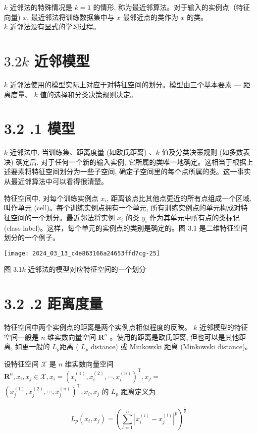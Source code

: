 \documentclass[10pt]{article}
\begin{document}
$k$ 近邻法的特殊情况是 $k=1$ 的情形, 称为最近邻算法。对于输入的实例点（特征向量) $x$, 最近邻法将训练数据集中与 $x$ 最邻近点的类作为 $x$ 的类。\\
$k$ 近邻法没有显式的学习过程。

\section*{$3.2 k$ 近邻模型}
$k$ 近邻法使用的模型实际上对应于对特征空间的划分。模型由三个基本要素 — 距离度量、 $k$ 值的选择和分类决策规则决定。

\section*{3.2 .1 模型}
$k$ 近邻法中, 当训练集、距离度量 (如欧氏距离) $、 k$ 值及分类决策规则 (如多数表决) 确定后, 对于任何一个新的输入实例, 它所属的类唯一地确定。这相当于根据上述要素将特征空间划分为一些子空间, 确定子空间里的每个点所属的类。这一事实从最近邻算法中可以看得很清楚。

特征空间中, 对每个训练实例点 $x_{i}$, 距离该点比其他点更近的所有点组成一个区域, 叫作单元 (cell)。每个训练实例点拥有一个单元, 所有训练实例点的单元构成对特征空间的一个划分。最近邻法将实例 $x_{i}$ 的类 $y_{i}$ 作为其单元中所有点的类标记 (class label)。这样，每个单元的实例点的类别是确定的。图 3.1 是二维特征空间划分的一个例子。

\begin{center}
\texttt{[image: 2024\_03\_13\_c4e863166a24653ffd7cg-25]}
\end{center}

图 $3.1 k$ 近邻法的模型对应特征空间的一个划分

\section*{3.2 .2 距离度量}
特征空间中两个实例点的距离是两个实例点相似程度的反映。 $k$ 近邻模型的特征空间一般是 $n$ 维实数向量空间 $\boldsymbol{R}^{n}$ 。使用的距离是欧氏距离, 但也可以是其他距离, 如更一般的 $L_{p}$距离 ( $L_{p}$ distance) 或 Minkowski 距离 (Minkowski distance)。

设特征空间 $\mathcal{X}$ 是 $n$ 维实数向量空间 $\boldsymbol{R}^{n}, x_{i}, x_{j} \in \mathcal{X}, x_{i}=\left(x_{i}^{(1)}, x_{i}^{(2)}, \cdots, x_{i}^{(n)}\right)^{\mathrm{T}}, x_{j}=$ $\left(x_{j}^{(1)}, x_{j}^{(2)}, \cdots, x_{j}^{(n)}\right)^{\mathrm{T}}, x_{i}, x_{j}$ 的 $L_{p}$ 距离定义为


\begin{equation*}
L_{p}\left(x_{i}, x_{j}\right)=\left(\sum_{l=1}^{n}\left|x_{i}^{(l)}-x_{j}^{(l)}\right|^{p}\right)^{\frac{1}{p}} \tag{3.2}
\end{equation*}
\end{document}
